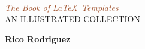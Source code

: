 \usepackage[svgnames]{xcolor} %

\begin{titlepage} %

	\centering %
	
	
	\setlength{\unitlength}{0.6\textwidth} %
	
	{\color{LightGoldenrod}}\\[\baselineskip] %
	
	\textcolor{Sienna}{\textit{\Huge The Book of \LaTeX ~Templates}}\\[\baselineskip] %
	
	{\color{RosyBrown}\Large AN ILLUSTRATED COLLECTION}\\ %
	
	{\color{LightGoldenrod}} %
	
	\vfill %
	
	
	{\Large\textbf{Rico Rodriguez}}\\ %
	
	\vfill %
	
	
	

\end{titlepage}
